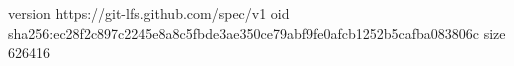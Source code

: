 version https://git-lfs.github.com/spec/v1
oid sha256:ec28f2c897c2245e8a8c5fbde3ae350ce79abf9fe0afcb1252b5cafba083806c
size 626416
